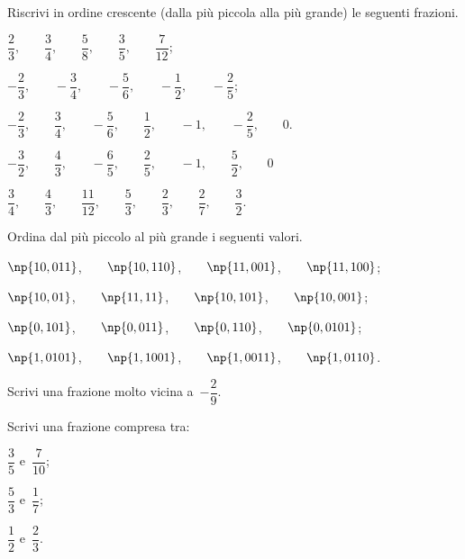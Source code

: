 \begin{esercizio}
 \label{ese:3.38}
Riscrivi in ordine crescente (dalla più piccola alla più grande) le seguenti frazioni.
\begin{enumeratea}
\item $\dfrac{2}{3}\text{,}\qquad\dfrac{3}{4}\text{,}\qquad\dfrac{5}{8}\text{,}\qquad\dfrac{3}{5}\text{,}\qquad\dfrac{7}{12}$;
\item $-\dfrac{2}{3}\text{,}\qquad-\dfrac{3}{4}\text{,}\qquad-\dfrac{5}{6}\text{,}\qquad-\dfrac{1}{2}\text{,}\qquad-\dfrac{2}{5}$;
\item $-\dfrac{2}{3}\text{,}\qquad\dfrac{3}{4}\text{,}\qquad-\dfrac{5}{6}\text{,}\qquad\dfrac{1}{2}\text{,}\qquad-1\text{,}\qquad-\dfrac{2}{5}\text{,}\qquad0.$
\item $-\dfrac{3}{2}\text{,}\qquad\dfrac{4}{3}\text{,}\qquad-\dfrac{6}{5}\text{,}\qquad\dfrac{2}{5}\text{,}\qquad-1\text{,}\qquad\dfrac{5}{2}\text{,}\qquad0$
\item $\dfrac{3}{4}\text{,}\qquad\dfrac{4}{3}\text{,}\qquad\dfrac{11}{12}\text{,}\qquad\dfrac{5}{3}\text{,}\qquad\dfrac{2}{3}\text{,}\qquad\dfrac{2}{7}\text{,}\qquad\dfrac{3}{2}$.
\end{enumeratea}
\end{esercizio}

\begin{esercizio}
 \label{ese:3.39}
Ordina dal più piccolo al più grande i seguenti valori.
\begin{enumeratea}
\item $\np{10,011}$,$\qquad\np{10,110}$,$\qquad\np{11,001}$,$\qquad\np{11,100}$;
\item $\np{10,01}$,$\qquad\np{11,11}$,$\qquad\np{10,101}$,$\qquad\np{10,001}$;
\item $\np{0,101}$,$\qquad\np{0,011}$,$\qquad\np{0,110}$,$\qquad\np{0,0101}$;
\item $\np{1,0101}$,$\qquad\np{1,1001}$,$\qquad\np{1,0011}$,$\qquad\np{1,0110}$.
\end{enumeratea}
\end{esercizio}

\begin{esercizio}
\label{ese:3.40}
Scrivi una frazione molto vicina a~$-\dfrac{2}{9}.$
\end{esercizio}

\begin{esercizio}
\label{ese:3.41}
Scrivi una frazione compresa tra:
\begin{multicols}{3}
\begin{enumeratea}
\item $\dfrac{3}{5}$ e~$\dfrac{7}{10}$;
\item $\dfrac{5}{3}$ e~$\dfrac{1}{7}$;
\item $\dfrac{1}{2}$ e~$\dfrac{2}{3}$.
\end{enumeratea}
\end{multicols}
\end{esercizio}

